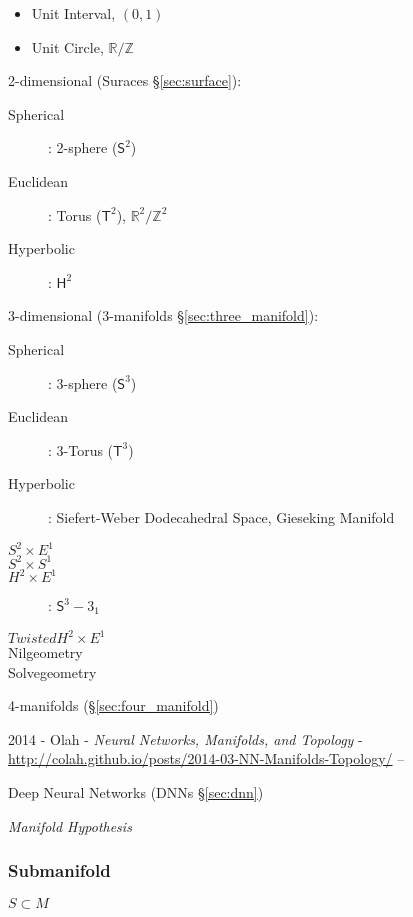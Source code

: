 \begin{itemize}
  \item Unit Interval, $(0,1)$
  \item Unit Circle, $\mathbb{R}/\mathbb{Z}$
\end{itemize}

2-dimensional (Suraces \S\ref{sec:surface}):

\begin{description}
  \item [Spherical]: 2-sphere ($\mathsf{S}^2$)
  \item [Euclidean]: Torus ($\mathsf{T}^2$),
  $\mathbb{R}^2/\mathbb{Z}^2$
  \item [Hyperbolic]: $\mathsf{H}^2$
\end{description}

3-dimensional (3-manifolds \S\ref{sec:three_manifold}):

\begin{description}
  \item [Spherical]: 3-sphere ($\mathsf{S}^3$)
  \item [Euclidean]: 3-Torus ($\mathsf{T}^3$)
  \item [Hyperbolic]: Siefert-Weber Dodecahedral Space, Gieseking
  Manifold
  \item [$S^2 \times E^1$]
  \item [$S^2 \times S^1$]
  \item [$H^2 \times E^1$]: $\mathsf{S}^3 - 3_1$
  \item [$Twisted H^2 \times E^1$]
  \item [Nilgeometry]
  \item [Solvegeometry]
\end{description}

4-manifolds (\S\ref{sec:four_manifold})

\asterism

2014 - Olah - \emph{Neural Networks, Manifolds, and Topology} -
\url{http://colah.github.io/posts/2014-03-NN-Manifolds-Topology/} --

Deep Neural Networks (DNNs \S\ref{sec:dnn})

\emph{Manifold Hypothesis}



\subsubsection{Submanifold}\label{sec:submanifold}

$S \subset M$

